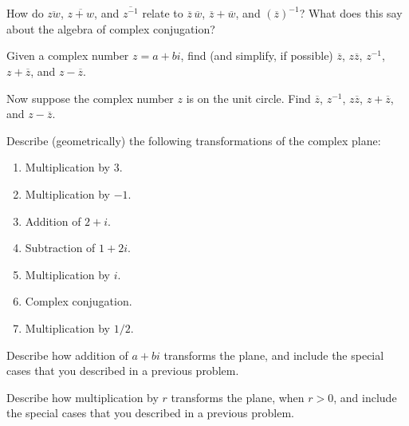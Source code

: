 \documentclass[space,nooutcomes]{ximera}
\begin{document}
\begin{problem}
How do $\overline{zw}$, $\overline{z+w}$, and $\overline{z^{-1}}$ relate to $\overline{z}\,\overline{w}$, $\overline{z}+\overline{w}$, and $(\overline{z})^{-1}$?  What does this say about the algebra of complex conjugation?  
\vfill 
\end{problem}

\begin{problem}
Given a complex number $z=a+bi$, find (and simplify, if possible) $\overline{z}$, $z\overline{z}$, $z^{-1}$, $z+\overline{z}$, and $z-\overline{z}$.  
\vfill 
\end{problem}

\begin{problem}
Now suppose the complex number $z$ is on the unit circle.  Find $\overline{z}$, $z^{-1}$, $z\overline{z}$, $z+\overline{z}$, and $z-\overline{z}$.
\vfill 
\end{problem}


\newpage 


\begin{problem}
Describe (geometrically) the following transformations of the complex plane: 
\begin{enumerate}
\item Multiplication by $3$. 
\item Multiplication by $-1$. 
\item Addition of $2 + i$. 
\item Subtraction of $1 + 2i$.  
\item Multiplication by $i$. 
\item Complex conjugation. 
\item Multiplication by $1/2$.  
\end{enumerate}
\vfill 
\end{problem}

\begin{problem}
Describe how addition of $a + bi$ transforms the plane, and include the special cases that you described in a previous problem.
\vfill 
\end{problem}

\begin{problem}
Describe how multiplication by $r$ transforms the plane, when $r > 0$, and include the special cases that you described in a previous problem.  
\vfill 
\end{problem}
\end{document}
